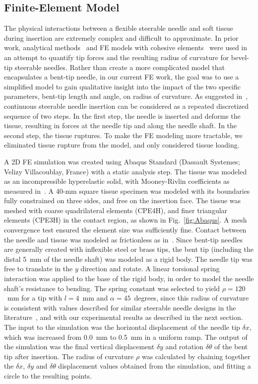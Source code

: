 \subsection{Finite-Element Model}
The physical interactions between a flexible steerable needle and soft tissue during insertion are extremely complex and difficult to approximate. In prior work, analytical methods~\cite{Misra2010} and FE models with cohesive elements~\cite{Misra2008} were used in an attempt to quantify tip forces and the resulting radius of curvature for bevel-tip steerable needles. Rather than create a more complicated model that encapsulates a bent-tip needle, in our current FE work, the goal was to use a simplified model to gain qualitative insight into the impact of the two specific parameters, bent-tip length and angle, on radius of curvature. As suggested in~\cite{Mahvash2001,Misra2010,Barbe2007}, continuous steerable needle insertion can be considered as a repeated discretized sequence of two steps. In the first step, the needle is inserted and deforms the tissue, resulting in forces at the needle tip and along the needle shaft. In the second step, the tissue ruptures. To make the FE modeling more tractable, we eliminated tissue rupture from the model, and only considered tissue loading. 

A 2D FE simulation was created using Abaqus Standard (Dassault Systemes; Velizy Villacoublay, France) with a static analysis step. The tissue was modeled as an incompressible hyperelastic solid, with Mooney-Rivlin coefficients as measured in~\cite{Kim2005}. A 40-mm square tissue specimen was modeled with its boundaries fully constrained on three sides, and free on the insertion face. The tissue was meshed with coarse quadrilateral elements (CPE4H), and finer triangular elements (CPE3H) in the contact region, as shown in Fig.~\ref{fig:Abaqus}. A mesh convergence test ensured the element size was sufficiently fine. Contact between the needle and tissue was modeled as frictionless as in~\cite{Misra2008}. Since bent-tip needles are generally created with inflexible steel or brass tips, the bent tip (including the distal 5~mm of the needle shaft) was modeled as a rigid body. The needle tip was free to translate in the $y$ direction and rotate. A linear torsional spring interaction was applied to the base of the rigid body, in order to model the needle shaft's resistance to bending. The spring constant was selected to yield $\rho = 120$~mm for a tip with $l = 4$~mm and $\alpha = 45$~degrees, since this radius of curvature is consistent with values described for similar steerable needle designs in the literature~\cite{Patil2014}, and with our experimental results as described in the next section. The input to the simulation was the horizontal displacement of the needle tip $\delta x$, which was increased from 0.0~mm to 0.5~mm in a uniform ramp. The output of the simulation was the final vertical displacement $\delta y$ and rotation $\delta\theta$ of the bent tip after insertion. The radius of curvature $\rho$ was calculated by chaining together the $\delta x$, $\delta y$ and $\delta\theta$ displacement values obtained from the simulation, and fitting a circle to the resulting points.

